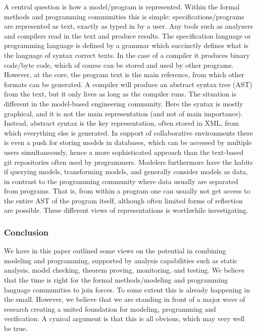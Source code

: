 A central question is how a model/program is 
represented. Within the formal methods and programming communities
this is simple: specifications/programs are represented as 
text, exactly as typed in by a user. Any tools such as analyzers 
and compilers read in the text and produce results. The 
specification language or programming language is defined by a 
grammar which succinctly defines what is the language of syntax 
correct texts. In the case of a compiler it produces binary 
code/byte code, which of course can be stored and used by other 
programs. However, at the 
core, the program text is the main reference, from which other 
formats can be generated. A compiler will produce an 
abstract syntax tree (AST) from the text, but it only lives as 
long as the compiler runs. 
The situation is different in the model-based 
engineering community. Here the syntax is mostly graphical, 
and it is not the main representation (and not of main 
importance). Instead, abstract syntax is the key 
representation, often stored in XML, from which everything else is generated. In support of collaborative environments there is even
a push for storing models in databases, which can be accessed
by multiple users simultaneously, hence a more sophisticated 
approach than the text-based git repositories often used by
programmers. Modelers furthermore have the habits if querying 
models, transforming models,
and generally consider models as data, in contrast to the
programming community where data usually are separated from 
programs. That is, from within a program one can usually not get
access to the entire AST of the program itself, although often 
limited forms of reflection are possible. These different views
of representations is worthwhile investigating.

\subsubsection{Conclusion}

We have in this paper outlined some views on the potential in 
combining modeling and programming, supported by analysis 
capabilities such as static analysis, model checking, theorem 
proving, monitoring, and testing. We believe that the time is right 
for the formal methods/modeling and programming language 
communities to join forces. To some extent this is already 
happening in the small. However, we believe that we are standing in 
front of a major wave of research creating a united foundation for 
modeling, programming and verification. A cynical argument is that 
this is all obvious, which may very well be true. 